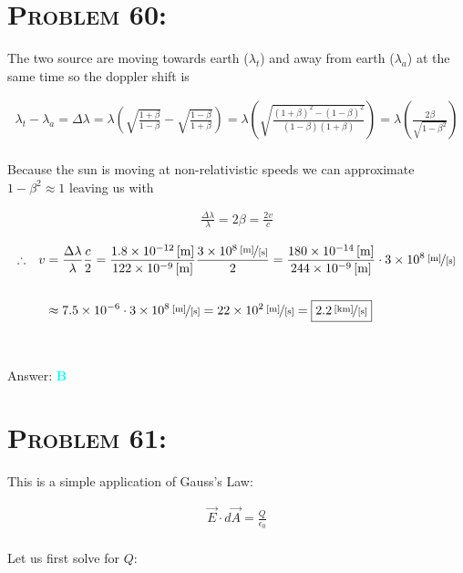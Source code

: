 \documentclass{article}
\providecommand{\e}[1]{\ensuremath{\times 10^{#1}}}
\begin{document}

\section{\textsc{Problem 60:}} The two source are moving towards earth ($\lambda_{t}$) and away from earth ($\lambda_{a}$) at the same time so the doppler shift is

\begin{gather}
%
\lambda_{t} - \lambda_{a} = \Delta \lambda 
%
= \lambda \left(   \sqrt{   \frac  {1+\beta}   {1- \beta}   }   -    \sqrt{ \frac   {1-\beta}    {1+\beta}  }  \right)   %
= \lambda \left(  \sqrt{   \frac    {(1+\beta)^{2} - (1-\beta)^{2}}    {(1-\beta)(1+\beta)}    }    \right)
%
= \lambda \left(   \frac{2\beta}{\sqrt{1- \beta^{2}}}  \right)\nonumber
\end{gather}
\\
Because the sun is moving at non-relativistic speeds we can approximate $1-\beta^{2} \approx 1$ leaving us with

\begin{gather}
\frac{\Delta \lambda } {\lambda} = 2 \beta = \frac{2v}{c} \nonumber
\end{gather}

\begin{align}
\therefore \hspace{.1in}  v  &= \frac{\Delta \lambda } {\lambda} \frac{c}{2} = \frac{\unit[1.8\e{-12}]{[m]}} {\unit[122\e{-9}]{[m]}} \frac{\unitfrac[3\e{8}]{[m]}{[s]}}{2}  = \frac{\unit[180\e{-14}]{[m]}} {\unit[244\e{-9}]{[m]}}\cdot \unitfrac[3\e{8}]{[m]}{[s]}\nonumber\\ 
\nonumber\\ 
&\approx 7.5\e{-6} \cdot \unitfrac[3\e{8}]{[m]}{[s]} = \unitfrac[22\e{2}]{[m]}{[s]} = \boxed{\unitfrac[2.2]{[km]}{[s]}}\nonumber
\end{align}
\\\\
Answer: \textbf{\textcolor{cyan}B}\\


\section{\textsc{Problem 61:}} This is a simple application of Gauss's Law:

\begin{gather}
\vec{E} \cdot d\vec{A}= \frac{Q}{\epsilon_{0}}
\end{gather}
\\
Let us first solve for $Q$:
\end{document}
